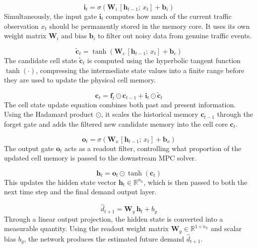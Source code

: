 \documentclass[journal]{IEEEtran}
\begin{document}
\begin{equation}
    \mathbf{i}_t = \sigma\!\left(\mathbf{W}_i\,[{\mathbf{h}_{t-1};\,x_t}]
                  + \mathbf{b}_i\right)
    \label{eq:lstm_i}
\end{equation}
Simultaneously, the input gate $\mathbf{i}_t$ computes how much of the current traffic observation $x_t$ should be permanently stored in the memory core. It uses its own weight matrix $\mathbf{W}_i$ and bias $\mathbf{b}_i$ to filter out noisy data from genuine traffic events.

\begin{equation}
    \tilde{\mathbf{c}}_t = \tanh\!\left(\mathbf{W}_c\,[{\mathbf{h}_{t-1};\,x_t}]
                          + \mathbf{b}_c\right)
    \label{eq:lstm_cand}
\end{equation}
The candidate cell state $\tilde{\mathbf{c}}_t$ is computed using the hyperbolic tangent function $\tanh(\cdot)$, compressing the intermediate state values into a finite range before they are used to update the physical cell memory.

\begin{equation}
    \mathbf{c}_t = \mathbf{f}_t \odot \mathbf{c}_{t-1}
                 + \mathbf{i}_t \odot \tilde{\mathbf{c}}_t
    \label{eq:lstm_cell}
\end{equation}
The cell state update equation combines both past and present information. Using the Hadamard product $\odot$, it scales the historical memory $\mathbf{c}_{t-1}$ through the forget gate and adds the filtered new candidate memory into the cell core $\mathbf{c}_t$.

\begin{equation}
    \mathbf{o}_t = \sigma\!\left(\mathbf{W}_o\,[{\mathbf{h}_{t-1};\,x_t}]
                  + \mathbf{b}_o\right)
    \label{eq:lstm_o}
\end{equation}
The output gate $\mathbf{o}_t$ acts as a readout filter, controlling what proportion of the updated cell memory is passed to the downstream MPC solver.

\begin{equation}
    \mathbf{h}_t = \mathbf{o}_t \odot \tanh(\mathbf{c}_t)
    \label{eq:lstm_h}
\end{equation}
This updates the hidden state vector $\mathbf{h}_t \in \mathbb{R}^{n_h}$, which is then passed to both the next time step and the final demand output layer.

\begin{equation}
    \hat{d}_{t+1} = \mathbf{W}_y\,\mathbf{h}_t + b_y
    \label{eq:lstm_out}
\end{equation}
Through a linear output projection, the hidden state is converted into a measurable quantity. Using the readout weight matrix $\mathbf{W}_y \in \mathbb{R}^{1 \times n_h}$ and scalar bias $b_y$, the network produces the estimated future demand $\hat{d}_{t+1}$.
\end{document}
